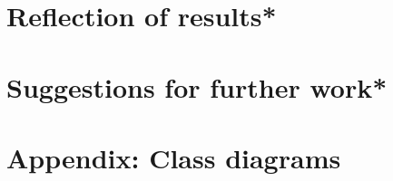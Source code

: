 \documentclass[10pt]{article}
\begin{document}
\section{Reflection of results*}

\section{Suggestions for further work*}

\newpage
\printbibliography[
	    heading=bibintoc,
        title={References}
    ]
\newpage
\appendix

\section{Appendix: Class diagrams}
\end{document}
